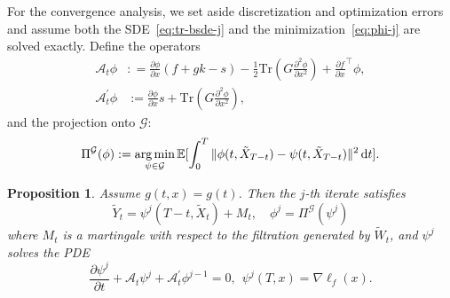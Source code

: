 \documentclass[letterpaper, 10 pt, conference]{ieeeconf}  %
\def\argmin{\mathop{\text{\rm arg\,min}}}
\def\Expect{{\mathbb E}}
\newtheorem{proposition}{Proposition}
\newcommand{\trace}{\text{Tr}}
\newcommand{\ud}{\,\mathrm{d}}
\def\argmin{\mathop{\text{\rm arg\,min}}}
\newcommand{\Xr}{\tilde X}
\newcommand{\Yr}{\tilde Y}
\begin{document}
 
 For the convergence analysis, we set aside discretization and optimization 
errors and assume both the SDE~\eqref{eq:tr-bsde-j} and the 
minimization~\eqref{eq:phi-j} are solved exactly. Define the 
operators
\begin{align*}
    \mathcal A_t \phi &: = \frac{\partial \phi}{\partial x} (f+gk-s) - \frac{1}{2}\trace(G\frac{\partial^2 \phi}{\partial x^2}) + \frac{\partial f}{\partial x}^\top \phi,\\\mathcal A^\prime_t \phi  &:= \frac{\partial \phi}{\partial x} s + \trace(G\frac{\partial^2 \phi}{\partial x^2}),
\end{align*}
and the projection onto $\mathcal{G}$:
\begin{align*}
    \Pi^{\mathcal G} (\phi) := \argmin_{\psi \in \mathcal G} \Expect[\int_0^T\|\phi(t,\tilde X_{T-t})-\psi(t,\tilde X_{T-t})\|^2\ud t]. 
\end{align*}
\begin{proposition}
Assume $g(t,x)=g(t)$. Then the $j$-th iterate satisfies
\begin{equation}\label{eq:Yr}
   \Yr_t = \psi^j(T-t,\Xr_t) + M_t,\quad \phi^j = \Pi^{\mathcal G} (\psi^j)
\end{equation}
where $M_t$ is a martingale with respect to the filtration generated by 
$\tilde{W}_t$, and $\psi^j$ solves the PDE
\begin{equation}\label{eq:pde-psi}
    \frac{\partial \psi^j}{\partial t} + \mathcal A_t\psi^j + \mathcal A^\prime_t \phi^{j-1} = 0, ~~\psi^j(T,x) = \nabla \ell_f(x). 
\end{equation}
\end{proposition}
\end{document}
